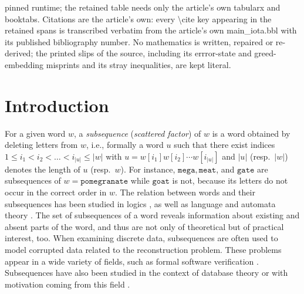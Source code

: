 \documentclass[10pt,a4paper]{amsart}
\theoremstyle{plain}
\theoremstyle{definition}
\begin{document}
pinned runtime; the retained table needs only the article's own tabularx and booktabs. Citations are the article's own: every \textbackslash{}cite key appearing in the retained spans is transcribed verbatim from the article's own main\_iota.bbl with its published bibliography number. No mathematics is written, repaired or re-derived; the printed slips of the source, including its errror-state and greed-embedding misprints and its stray inequalities, are kept literal.
	\section{Introduction}
For a given word $w$, a \emph{subsequence} (\emph{scattered factor}) of $w$ is a 
word obtained by deleting letters from $w$, i.e.,  formally a word $u$ such that there exist  
indices $1 \leq i_1 < i_2 < \dots < i_{\vert u \vert} \leq \vert w \vert$ with $u = w[i_1] w[i_2] 
\cdots w[i_{\vert u \vert}]$ and $\vert u \vert$ (resp.~$\vert w \vert$) denotes the length of $u$ 
(resp.~$w$). For instance, $\mathtt{mega}, \mathtt{meat}$, and $\mathtt{gate}$ are subsequences 
of $w=\mathtt{pomegranate}$ while $\mathtt{goat}$ is not, because 
its letters do not occur in the correct order in $w$.
The relation between words and their subsequences has been studied in
logics \cite{DBLP:conf/lics/HalfonSZ17,10.1007/978-3-030-17127-8_20}, as well as language and automata theory \cite{DBLP:conf/isaac/AdamsonFHKMN23,DBLP:journals/ipl/KarandikarKS15,DBLP:journals/lmcs/KarandikarS19,simon1972hierarchies,DBLP:conf/automata/Simon75,zetzsche:LIPIcs.ICALP.2016.123}.
The set of subsequences of a word reveals information about existing and absent parts of the word, and thus are not only of theoretical but of practical interest, too. When examining discrete data, subsequences are often used to model corrupted data \cite{dress2005reconstructing,DBLP:journals/ijfcs/FleischmannLMNR21,DBLP:conf/dlt/Manuch99} related to the reconstruction problem. These problems appear in a wide variety of fields, such as 
formal software verification \cite{DBLP:conf/lics/HalfonSZ17,zetzsche:LIPIcs.ICALP.2016.123}. Subsequences have also been studied in the context of database theory \cite{artikis2017complex,Kleest-Meissner22,Kleest-Meissner23,SchmidSIGMOD} or with motivation coming from this field \cite{DayKMS22,Goettingen2023words,ManeaRS24}. 
\end{document}
